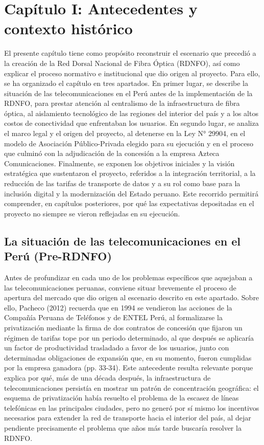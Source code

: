 \section{Capítulo I: Antecedentes y contexto histórico}
El presente capítulo tiene como propósito reconstruir el escenario que precedió a la creación de la Red Dorsal Nacional de Fibra Óptica (RDNFO), así como explicar el proceso normativo e institucional que dio origen al proyecto. Para ello, se ha organizado el capítulo en tres apartados. En primer lugar, se describe la situación de las telecomunicaciones en el Perú antes de la implementación de la RDNFO, para prestar atención al centralismo de la infraestructura de fibra óptica, al aislamiento tecnológico de las regiones del interior del país y a los altos costos de conectividad que enfrentaban los usuarios. En segundo lugar, se analiza el marco legal y el origen del proyecto, al detenerse en la Ley N° 29904, en el modelo de Asociación Público-Privada elegido para su ejecución y en el proceso que culminó con la adjudicación de la concesión a la empresa Azteca Comunicaciones. Finalmente, se exponen los objetivos iniciales y la visión estratégica que sustentaron el proyecto, referidos a la integración territorial, a la reducción de las tarifas de transporte de datos y a su rol como base para la inclusión digital y la modernización del Estado peruano. Este recorrido permitirá comprender, en capítulos posteriores, por qué las expectativas depositadas en el proyecto no siempre se vieron reflejadas en su ejecución.
\subsection{La situación de las telecomunicaciones en el Perú (Pre-RDNFO)}
Antes de profundizar en cada uno de los problemas específicos que aquejaban a las telecomunicaciones peruanas, conviene situar brevemente el proceso de apertura del mercado que dio origen al escenario descrito en este apartado. Sobre ello, Pacheco (2012) recuerda que en 1994 se vendieron las acciones de la Compañía Peruana de Teléfonos y de ENTEL Perú, al formalizarse la privatización mediante la firma de dos contratos de concesión que fijaron un régimen de tarifas tope por un periodo determinado, al que después se aplicaría un factor de productividad trasladado a favor de los usuarios, junto con determinadas obligaciones de expansión que, en su momento, fueron cumplidas por la empresa ganadora (pp. 33-34). Este antecedente resulta relevante porque explica por qué, más de una década después, la infraestructura de telecomunicaciones persistía en mostrar un patrón de concentración geográfica: el esquema de privatización había resuelto el problema de la escasez de líneas telefónicas en las principales ciudades, pero no generó por sí mismo los incentivos necesarios para extender la red de transporte hacia el interior del país, al dejar pendiente precisamente el problema que años más tarde buscaría resolver la RDNFO.
